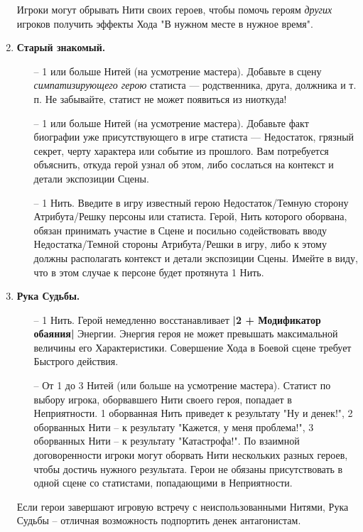 \begin{enumerate}
\begin{itemize}
\end{itemize}
\begin{tcolorbox}
Игроки могут обрывать Нити своих героев, чтобы помочь героям \textit{других} игроков получить эффекты Хода "В нужном месте в нужное время".
\end{tcolorbox}
\item \textbf{Старый знакомый.}
\begin{itemize}
\item[--] 1 или больше Нитей (на усмотрение мастера). Добавьте в сцену \textit{симпатизирующего герою} статиста — родственника, друга, должника и т. п. Не забывайте, статист не может появиться из ниоткуда!
\item[--] 1 или больше Нитей (на усмотрение мастера). Добавьте факт биографии уже присутствующего в игре статиста — Недостаток, грязный секрет, черту характера или событие из прошлого. Вам потребуется объяснить, откуда герой узнал об этом, либо сослаться на контекст и детали экспозиции Сцены.
\item[--] 1 Нить. Введите в игру известный герою Недостаток/Темную сторону Атрибута/Решку персоны или статиста. Герой, Нить которого оборвана, обязан принимать участие в Сцене и посильно содействовать вводу Недостатка/Темной стороны Атрибута/Решки в игру, либо к этому должны располагать контекст и детали экспозиции Сцены. Имейте в виду, что в этом случае к персоне будет протянута 1 Нить.
\end{itemize}
\item \textbf{Рука Судьбы.}
\begin{itemize}
\item[--] 1 Нить. Герой немедленно восстанавливает \textbf{|2 + Модификатор обаяния|} Энергии. Энергия героя не может превышать максимальной величины его Характеристики. Совершение Хода в Боевой сцене требует Быстрого действия.
\item[--] От 1 до 3 Нитей (или больше на усмотрение мастера). Статист по выбору игрока, оборвавшего Нити своего героя, попадает в Неприятности. 1 оборванная Нить приведет к результату "Ну и денек!", 2 оборванных Нити – к результату "Кажется, у меня проблема!", 3 оборванных Нити – к результату "Катастрофа!". По взаимной договоренности игроки могут оборвать Нити нескольких разных героев, чтобы достичь нужного результата. Герои не обязаны присутствовать в одной сцене со статистами, попадающими в Неприятности.
\end{itemize}
\begin{tcolorbox}
Если герои завершают игровую встречу с неиспользованными Нитями, Рука Судьбы – отличная возможность подпортить денек антагонистам.

\end{tcolorbox}
\end{enumerate}
